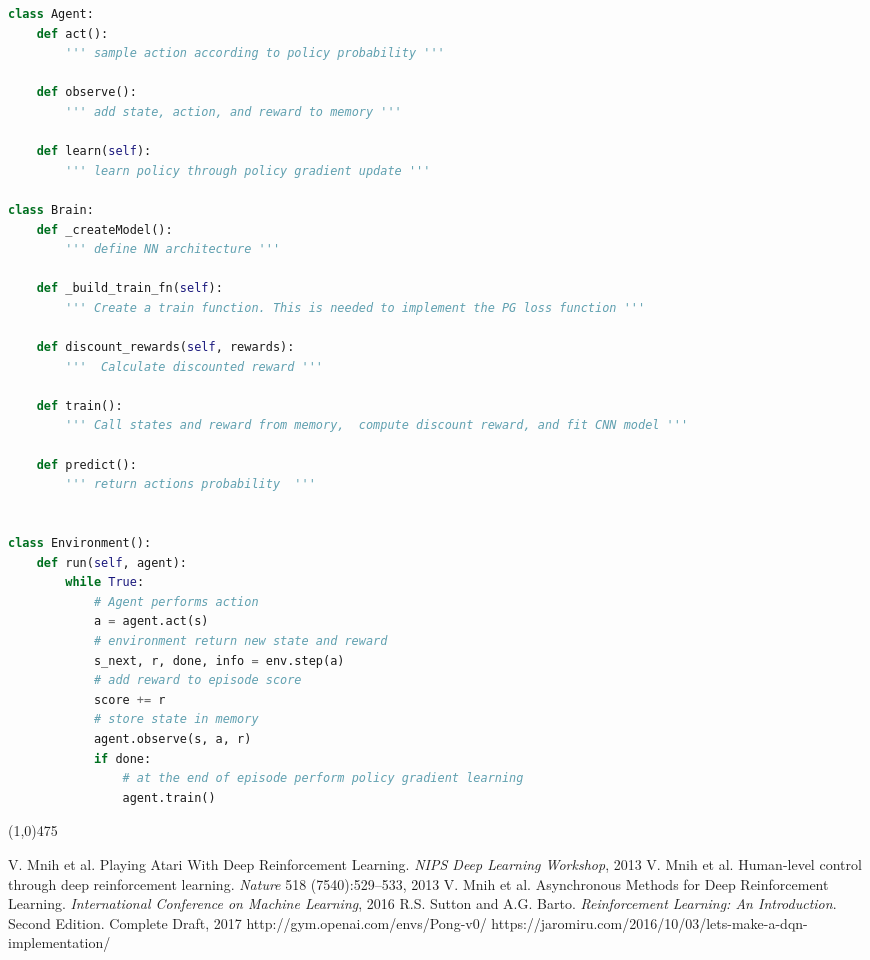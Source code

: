 \documentclass[a4paper, 11pt]{article}
\newcommand{\hl}{\begin{center} \line(1,0){475} \end{center}} %
\begin{document}
\begin{lstlisting}[language=Python, caption=Policy Gradient algorithm framework, label={lst:PG}]
class Agent:        
    def act():
        ''' sample action according to policy probability '''
    
    def observe():
        ''' add state, action, and reward to memory '''
    
    def learn(self):
        ''' learn policy through policy gradient update '''
        
class Brain:
    def _createModel():
        ''' define NN architecture '''
    
    def _build_train_fn(self):
        ''' Create a train function. This is needed to implement the PG loss function '''
    
    def discount_rewards(self, rewards):
        '''  Calculate discounted reward '''
    
    def train():
        ''' Call states and reward from memory,  compute discount reward, and fit CNN model '''
    
    def predict():
        ''' return actions probability  '''


class Environment():        
    def run(self, agent):        
        while True:
            # Agent performs action
            a = agent.act(s)
            # environment return new state and reward
            s_next, r, done, info = env.step(a)
            # add reward to episode score
            score += r
            # store state in memory 
            agent.observe(s, a, r)
            if done:
                # at the end of episode perform policy gradient learning
                agent.train()
\end{lstlisting}

\hl

\begin{thebibliography}{9}
  V. Mnih et al. Playing Atari With Deep Reinforcement Learning. \emph{NIPS Deep Learning Workshop}, 2013
  V. Mnih et al. Human-level control through deep reinforcement learning. \emph{Nature} 518 (7540):529--533, 2013
  V. Mnih et al. Asynchronous Methods for Deep Reinforcement Learning. \emph{ International Conference on Machine Learning}, 2016
 R.S. Sutton and A.G. Barto. \emph{Reinforcement Learning: An Introduction}. Second Edition. Complete Draft, 2017
 http://gym.openai.com/envs/Pong-v0/
 https://jaromiru.com/2016/10/03/lets-make-a-dqn-implementation/

\end{thebibliography}
\end{document}
